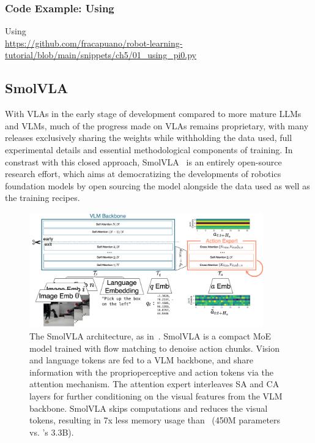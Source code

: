 \subsubsection{Code Example: Using \pizero}
\begin{pbox}[label={ex:using-pizero}]{Using \pizero \\ \url{https://github.com/fracapuano/robot-learning-tutorial/blob/main/snippets/ch5/01_using_pi0.py}}
    
\end{pbox}

\subsection{SmolVLA}
With VLAs in the early stage of development compared to more mature LLMs and VLMs, much of the progress made on VLAs remains proprietary, with many releases exclusively sharing the weights while withholding the data used, full experimental details and essential methodological components of training.
In constrast with this closed approach, SmolVLA~\citep{shukorSmolVLAVisionLanguageActionModel2025} is an entirely open-source research effort, which aims at democratizing the developments of robotics foundation models by open sourcing the model alongside the data used as well as the training recipes.

\begin{figure}
    \centering
    \includegraphics[width=0.9\textwidth]{figures/ch5/ch5-smolvla.pdf}
    \caption{The SmolVLA architecture, as in~\citet{shukorSmolVLAVisionLanguageActionModel2025}. SmolVLA is a compact MoE model trained with flow matching to denoise action chunks. Vision and language tokens are fed to a VLM backbone, and share information with the proprioperceptive and action tokens via the attention mechanism. The attention expert interleaves SA and CA layers for further conditioning on the visual features from the VLM backbone. SmolVLA skips computations and reduces the visual tokens, resulting in 7x less memory usage than \pizero~(450M parameters vs. \pizero's 3.3B).}
    \label{fig:ch5-smolvla}
\end{figure}

